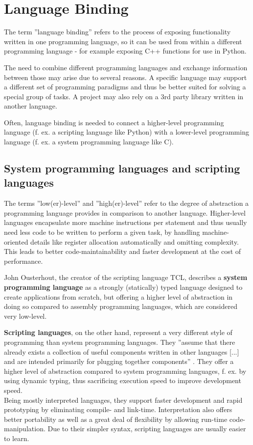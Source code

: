 \chapter{Language Binding}

The term ''language binding'' refers to the process of exposing functionality written in one programming language, so it can be used from within a different programming language - for example exposing C++ functions for use in Python.

The need to combine different programming languages and exchange information between those may arise due to several reasons. A specific language may support a different set of programming paradigms and thus be better suited for solving a special group of tasks. A project may also rely on a 3rd party library written in another language.

Often, language binding is needed to connect a higher-level programming language (f. ex. a scripting language like Python) with a lower-level programming language (f. ex. a system programming language like C).

\section{System programming languages and scripting languages}

The terms ''low(er)-level'' and ''high(er)-level'' refer to the degree of abstraction a programming language provides in comparison to another language. Higher-level languages encapsulate more machine instructions per statement and thus usually need less code to be written to perform a given task, by handling machine-oriented details like register allocation automatically and omitting complexity. This leads to better code-maintainability and faster development at the cost of performance. 

John Ousterhout, the creator of the scripting language TCL, describes a \textbf{system programming language} as a strongly (statically) typed language designed to create applications from scratch, but offering a higher level of abstraction in doing so compared to assembly programming languages, which are considered very low-level.

\textbf{Scripting languages}, on the other hand, represent a very different style of programming than system programming languages. They ''assume that there already exists a collection of useful components written in other languages [...] and are intended primarily for plugging together components'' . They offer a higher level of abstraction compared to system programming languages, f. ex. by using dynamic typing, thus sacrificing execution speed to improve development speed.\\ Being mostly interpreted languages, they support faster development and rapid prototyping by eliminating compile- and link-time. Interpretation also offers better portability as well as a great deal of flexibility by allowing run-time code-manipulation. Due to their simpler syntax, scripting languages are usually easier to learn.

